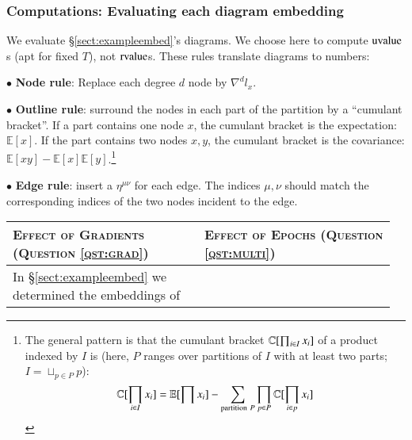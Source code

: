 \documentclass[anon,12pt]{colt2021} %
\newcommand{\uvalue}{\text{\textnormal{uvalue}}}
\newcommand{\rvalue}{\text{\textnormal{rvalue}}}
\newcommand{\expc}{\mathbb{E}}
\begin{document}
    \begin{landscape}
        \subsubsection{Computations: Evaluating each diagram embedding}\label{sect:example-eval}
            We evaluate \S\ref{sect:exampleembed}'s diagrams.  We choose here to
            compute $\uvalue$s (apt for fixed $T$), not
            $\rvalue$s.  These rules translate diagrams to numbers:
            \par \indent $\bullet$
                \textbf{Node rule}: Replace each degree $d$ node by $\nabla^d
                l_x$.
            \par \indent $\bullet$
                \textbf{Outline rule}: surround the nodes in each part of the
                partition by a ``cumulant bracket''.  If a part contains one
                node $x$, the cumulant bracket is the expectation: $\expc[x]$.
                If the part contains two nodes $x,y$, the cumulant bracket is
                the covariance: $\expc[xy]-\expc[x]\expc[y]$.\footnote{
                    The general pattern is that the cumulant bracket $\mathbb{C}[\prod_{i\in I} x_i]$
                    of a product indexed by $I$ is (here, $P$ ranges over partitions of $I$ with at least 
                    two parts; $I = \sqcup_{p\in P} p$):
                    $$
                        \CC[\prod_{i\in I} x_i] = \expc[\prod x_i] - \sum_{\text{partition}~P} \prod_{p\in P} \CC[\prod_{i\in p} x_i]
                    $$
                }
            \par \indent $\bullet$
                \textbf{Edge rule}: insert a $\eta^{\mu\nu}$ for each
                edge.  The indices $\mu, \nu$ should match the corresponding
                indices of the two nodes incident to the edge.
        \newline
        \par\noindent
        \begin{tabular}{p{0.48\linewidth}p{0.48\linewidth}}
            \textsc{Effect of Gradients (Question \ref{qst:grad})}&\textsc{Effect of Epochs (Question \ref{qst:multi})}\\
            \hline
            In \S\ref{sect:exampleembed} we determined the embeddings of

\end{tabular}
\end{landscape}
\end{document}
